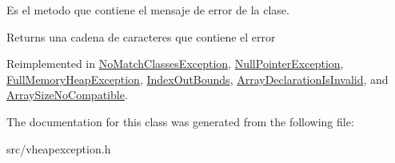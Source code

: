 Es el metodo que contiene el mensaje de error de la clase. 

\begin{DoxyReturn}{Returns}
una cadena de caracteres que contiene el error 
\end{DoxyReturn}


Reimplemented in \hyperlink{class_no_match_classes_exception_a1dc1f5956c7e6c2a9211432471a60e6d}{No\-Match\-Classes\-Exception}, \hyperlink{class_null_pointer_exception_a0dcc55bb0f3a50e888d8d4a904508313}{Null\-Pointer\-Exception}, \hyperlink{class_full_memory_heap_exception_a66ee760289cae528c31ffdedfc2ccc0a}{Full\-Memory\-Heap\-Exception}, \hyperlink{class_index_out_bounds_a0d2a6f3a345d776daf642e6210aad2f2}{Index\-Out\-Bounds}, \hyperlink{class_array_declaration_is_invalid_a74bc87f5d88b08be96bf2178b23f20e9}{Array\-Declaration\-Is\-Invalid}, and \hyperlink{class_array_size_no_compatible_a615b33706018426059fe78a13edf4549}{Array\-Size\-No\-Compatible}.



The documentation for this class was generated from the following file\-:\begin{DoxyCompactItemize}
\item 
src/vheapexception.\-h\end{DoxyCompactItemize}
